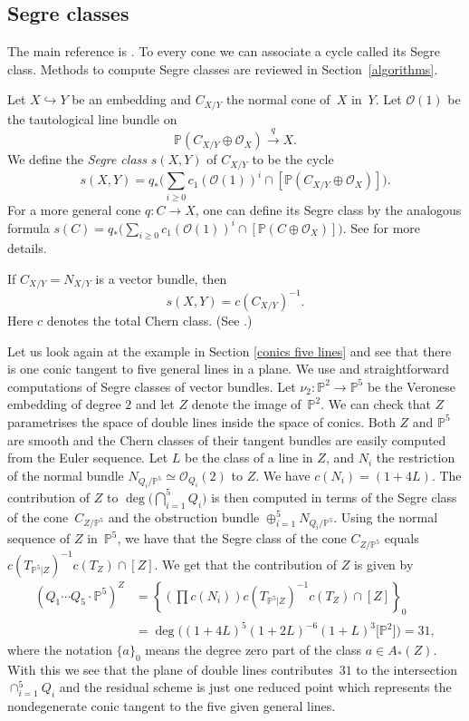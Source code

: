 \documentclass[pdftex]{sigma}
\numberwithin{equation}{section}
\newcommand{\PP}{\mathbb P}
\begin{document}
\subsection{Segre classes}
The main reference is \cite[Chapter~4]{Fulton}. To every cone we can associate a cycle called its Segre class. Methods to compute Segre classes are reviewed in Section~\ref{algorithms}.
\begin{Definition}
Let $X\hookrightarrow Y$ be an embedding and $C_{X/Y}$ the normal cone of~$X$ in~$Y$. Let $\mathcal O(1)$ be the tautological line bundle on
\[\PP(C_{X/Y}\oplus \mathcal O_X)\stackrel{q}{\longrightarrow}X.
\]
We define the \emph{Segre class} $s(X,Y)$ of $C_{X/Y}$ to be the cycle
\[
s(X,Y)=q_*\bigg(\sum_{i\geq 0}c_1(\mathcal O(1))^i\cap[\PP(C_{X/Y}\oplus \mathcal O_X)]\bigg).
\]
For a more general cone $q\colon C\to X$, one can define its Segre class by the analogous formula $s(C)=q_*\big(\sum_{i\geq 0}c_1(\mathcal O(1))^i\cap[\PP(C\oplus \mathcal O_X)]\big)$. See \cite[Chapter~4]{Fulton} for more details.
\end{Definition}
\begin{Example}\label{ex:s=cinv} If $C_{X/Y}=N_{X/Y}$ is a vector bundle, then
\[s(X,Y)=c(C_{X/Y})^{-1}.\]
Here $c$ denotes the total Chern class. (See \cite[Proposition~4.1]{Fulton}.)
\end{Example}
\begin{Example}\label{conics lines revised}
Let us look again at the example in Section \ref{conics five lines} and see that there is one conic tangent to five general lines in a plane. We use \cite[Proposition~9.1.1]{Fulton} and straightforward computations of Segre classes of vector bundles. Let $\nu_2\colon\mathbb P^2\to\mathbb P^5$ be the Veronese embedding of degree $2$ and let $Z$ denote the image of~$\mathbb P^2$. We can check that $Z$ parametrises the space of double lines inside the space of conics. Both $Z$ and $\PP^5$ are smooth and the Chern classes of their tangent bundles are easily computed from the Euler sequence. Let $L$ be the class of a line in $Z$, and $N_i$ the restriction of the normal bundle $N_{Q_i/\mathbb P^5}\simeq\mathcal O_{Q_i}(2)$ to $Z$. We have $c(N_i)=(1+4L)$. The contribution of $Z$ to $\deg\big(\bigcap_{i=1}^5 Q_i\big)$ is then computed in terms of the Segre class of the cone~$C_{Z/\PP^5}$ and the obstruction bundle $\oplus_{i=1}^5N_{Q_i/\mathbb P^5}$. Using the normal sequence of $Z$ in~$\PP^5$, we have that the Segre class of the cone $C_{Z/\PP^5}$ equals $c(T_{\mathbb P^5|Z})^{-1} c(T_Z)\cap [Z]$. We get that the contribution of $Z$ is given by
\begin{align*}
 (Q_1\cdots Q_5\cdot\mathbb P^5)^Z& =\left\{ \left(\prod c(N_i)\right) c(T_{\mathbb P^5|Z})^{-1} c(T_Z)\cap [Z]\right\}_0\\& =\deg\big((1+4L)^5(1+2L)^{-6}(1+L)^3\big[\mathbb P^2\big]\big) =31,
\end{align*}
where the notation $\{a\}_0$ means the degree zero part of the class $a\in A_*(Z)$. With this we see that the plane of double lines contributes~$31$ to the intersection $\cap_{i=1}^5Q_i$ and the residual scheme is just one reduced point which represents the nondegenerate conic tangent to the five given general lines.
\end{Example}
\end{document}

